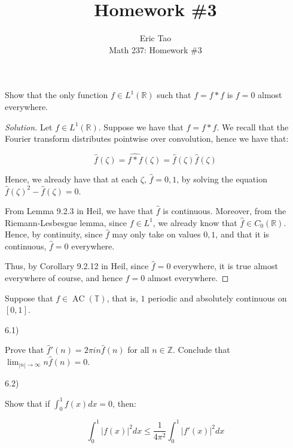 \documentclass[10pt]{article}
\newenvironment{problem}[2][]{\begin{trivlist}
\item[\hskip \labelsep {\bfseries #1}\hskip \labelsep {\bfseries #2.}]}{\end{trivlist}}
\begin{document}
 
\title{Homework \#3}
\author{Eric Tao\\
Math 237: Homework \#3}
\maketitle

\begin{problem}{Question 1}

Show that the only function $f \in L^1(\mathbb{R})$ such that $f  = f \ast f$ is $f = 0$ almost everywhere.

\end{problem}
\begin{proof}[Solution]

Let $f \in L^1(\mathbb{R})$. Suppose we have that $f = f \ast f$. We recall that the Fourier transform distributes pointwise over convolution, hence we have that:

$$ \hat{f}(\zeta ) = \widehat{f \ast f}(\zeta)  = \hat{f}(\zeta) \hat{f}(\zeta) $$

Hence, we already have that at each $\zeta$, $\hat{f} = 0, 1$, by solving the equation $\hat{f}(\zeta)^2 - \hat{f}(\zeta) = 0$. 

From Lemma 9.2.3 in Heil, we have that $\hat{f}$ is continuous. Moreover, from the Riemann-Lesbesgue lemma, since $f \in L^1$, we already know that $\hat{f} \in C_0(\mathbb{R})$. Hence, by continuity, since $\hat{f}$ may only take on values $0,1$, and that it is continuous, $\hat{f} = 0$ everywhere.

Thus, by Corollary 9.2.12 in Heil, since $\hat{f} = 0$ everywhere, it is true almost everywhere of course, and hence $f= 0$ almost everywhere.

\end{proof}

\begin{problem}{Question 6}

Suppose that $f \in \operatorname{AC}(\mathbb{T})$, that is, $1$ periodic and absolutely continuous on $[0,1]$.

6.1)

Prove that $\hat{f}'(n) = 2\pi i n \hat{f}(n)$ for all $n \in \mathbb{Z}$. Conclude that $\lim_{|n| \to \infty} n \hat{f}(n) = 0$.

6.2)

Show that if $\int_0^1 f(x) dx = 0$, then:

$$ \int_0^1 |f(x)|^2 dx \leq \frac{1}{4\pi^2} \int_0^1 |f'(x)|^2 dx $$


\end{problem}
\end{document}
